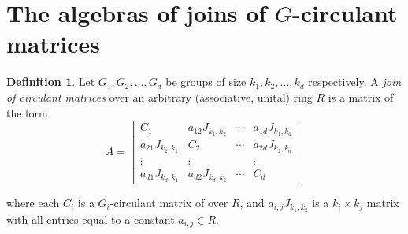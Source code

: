 \documentclass[12pt, a4paper]{amsart}
\numberwithin{equation}{section} %
\theoremstyle{plain}
\theoremstyle{definition}
\newtheorem{defn}[thm]{Definition}
\theoremstyle{plain}
\theoremstyle{remark}
\newcommand{\ones}{J}
\begin{document}
\section{The algebras of joins of $G$-circulant matrices}
\begin{defn}
Let $G_1, G_2, \ldots, G_d$ be groups of size $k_1, k_2, \ldots, k_d$ respectively. A \textit{join of circulant matrices} over an arbitrary (associative, unital) ring $R$ is a matrix of the form
\begin{equation}\label{eq:join circulant matrix}\tag{$\ast$}
A=\begin{bmatrix} 
C_1&a_{12} J_{k_1,k_2} &\cdots & a_{1d}J_{k_1,k_d}\\
a_{21}J_{k_2,k_1} &C_2 &\cdots & a_{2d}J_{k_2,k_d}\\
\vdots&\vdots& &\vdots\\
a_{d1}J_{k_d,k_1}&a_{d2}J_{k_d,k_2}&\cdots& C_d
\end{bmatrix} 
\end{equation}

where each $C_i$ is a $G_i$-circulant matrix of over $R$, and $a_{i,j}\ones_{k_1, k_2}$ is a $k_i \times k_j$ matrix with all entries equal to a constant $a_{i,j}\in R$.
\end{defn} 
\end{document}
